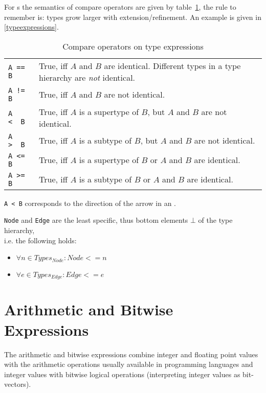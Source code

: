 For s the semantics of compare operators are given by table~\ref{compandtypes},
the rule to remember is: types grow larger with extension/refinement. An example is given in \ref{typeexpressions}.
\begin{table}[htbp]
  \centering
  \begin{tabularx}{\linewidth}{|l|X|} \hline
    \texttt{A == B} & True, iff $A$ and $B$ are identical. Different types in a type hierarchy are \emph{not} identical. \\
    \texttt{A != B} & True, iff $A$ and $B$ are not identical. \\
    \texttt{A <\ \ B} & True, iff $A$ is a supertype of $B$, but $A$ and $B$ are not identical. \\
    \texttt{A >\ \ B} & True, iff $A$ is a subtype of $B$, but $A$ and $B$ are not identical. \\
    \texttt{A <= B} & True, iff $A$ is a supertype of $B$ or $A$ and $B$ are identical. \\
    \texttt{A >= B} & True, iff $A$ is a subtype of $B$ or $A$ and $B$ are identical. \\ \hline
  \end{tabularx}
  \caption{Compare operators on type expressions}
  \label{compandtypes}
\end{table}
\begin{note}
  \texttt{A < B} corresponds to the direction of the arrow in an .
\end{note}
\begin{note}
  \texttt{Node} and \texttt{Edge} are the least specific, thus bottom elements $\bot$ of the type hierarchy,\\
  i.e. the following holds:
  \begin{itemize}
    \item $\forall n\in Types_{Node}: Node <= n$
    \item $\forall e\in Types_{Edge}: Edge <= e$
  \end{itemize}
\end{note}

\section{Arithmetic and Bitwise Expressions}

The arithmetic and bitwise expressions combine integer and floating point values with the arithmetic operations usually available in programming languages
and integer values with bitwise logical operations (interpreting integer values as bit-vectors).

